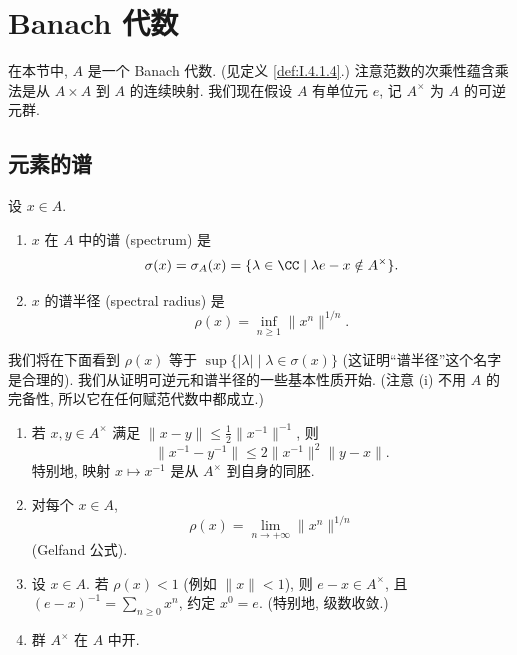 
\section{Banach 代数}
在本节中, $A$ 是一个 Banach 代数. (见定义 \ref{def:I.4.1.4}.) 注意范数的次乘性蕴含乘法是从 $A \times A$ 到 $A$ 的连续映射.
我们现在假设 $A$ 有单位元 $e$, 记 $A^{\times}$ 为 $A$ 的可逆元群.

\subsection{元素的谱}

\begin{definition}[谱与谱半径]
\label{def:II.1.1.1}
设 $x \in A$.
\begin{enumerate}
\item[(i)] $x$ 在 $A$ 中的谱 (spectrum) 是
\[
\sigma(x) = \sigma_A(x) = \{\lambda \in \CC \mid \lambda e - x \notin A^{\times}\}.
\]
\item[(ii)] $x$ 的谱半径 (spectral radius) 是
\[
\rho(x) = \inf_{n \geq 1}\|x^n\|^{1/n}.
\]
\end{enumerate}
\end{definition}

我们将在下面看到 $\rho(x)$ 等于 $\sup\{|\lambda| \mid \lambda \in \sigma(x)\}$ (这证明``谱半径''这个名字是合理的).
我们从证明可逆元和谱半径的一些基本性质开始. (注意 (i) 不用 $A$ 的完备性, 所以它在任何赋范代数中都成立.)

\begin{proposition}[可逆元的基本性质]
\label{prop:II.1.1.2}
\begin{enumerate}
\item[(i)] 若 $x, y \in A^{\times}$ 满足 $\|x - y\| \leq \frac{1}{2}\|x^{-1}\|^{-1}$, 则
\[
\|x^{-1} - y^{-1}\| \leq 2\|x^{-1}\|^2\|y - x\|.
\]
特别地, 映射 $x \longmapsto x^{-1}$ 是从 $A^{\times}$ 到自身的同胚.
\item[(ii)] 对每个 $x \in A$,
\[
\rho(x) = \lim_{n \to +\infty}\|x^n\|^{1/n}
\]
(Gelfand 公式).
\item[(iii)] 设 $x \in A$. 若 $\rho(x) < 1$ (例如 $\|x\| < 1$), 则 $e - x \in A^{\times}$, 且 $(e - x)^{-1} = \sum_{n \geq 0}x^n$, 约定 $x^0 = e$. (特别地, 级数收敛.)
\item[(iv)] 群 $A^{\times}$ 在 $A$ 中开.
\end{enumerate}
\end{proposition}

